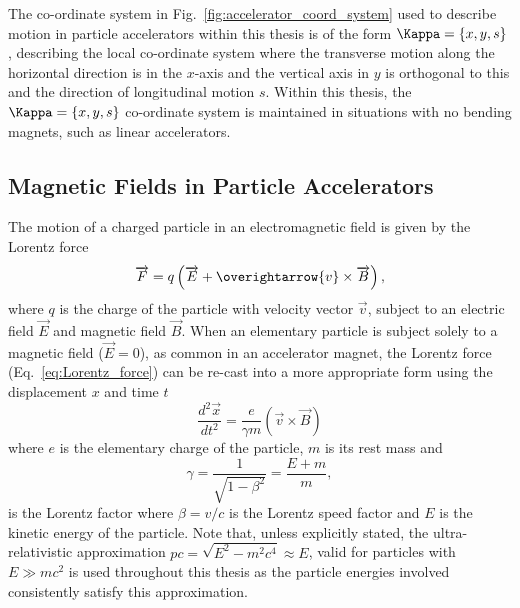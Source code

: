 \documentclass[../main.tex]{subfiles}
\begin{document}
The co-ordinate system in Fig.~\ref{fig:accelerator_coord_system} used to describe motion in particle accelerators within this thesis is of the form $\Kappa = \left\{x,y,s\right\}$, describing the local co-ordinate system where the transverse motion along the horizontal direction is in the $x$-axis and the vertical axis in $y$ is orthogonal to this and the direction of longitudinal motion $s$. Within this thesis, the $\Kappa = \left\{x,y,s\right\}$ co-ordinate system is maintained in situations with no bending magnets, such as linear accelerators.     

\subsection{Magnetic Fields in Particle Accelerators}

The motion of a charged particle in an electromagnetic field is given by the Lorentz force 
\begin{equation}
\overrightarrow{F} = q\left(\overrightarrow{E}+\overightarrow{v}\times\overrightarrow{B}\right),
\label{eq:Lorentz_force}    
\end{equation}
where $q$ is the charge of the particle with velocity vector $\overrightarrow{v}$, subject to an electric field $\overrightarrow{E}$ and magnetic field $\overrightarrow{B}$. When an elementary particle is subject solely to a magnetic field ($\overrightarrow{E}=0$), as common in an accelerator magnet, the Lorentz force (Eq.~\ref{eq:Lorentz_force}) can be re-cast into a more appropriate form using the displacement $x$ and time $t$
\begin{equation}
\frac{d^{2}\overrightarrow{x}}{dt^{2}} = \frac{e}{\gamma m}\left(\overrightarrow{v}\times\overrightarrow{B}\right)
\label{eq:displacement_Lorentz}    
\end{equation}
where $e$ is the elementary charge of the particle, $m$ is its rest mass and
\begin{equation}
\gamma = \frac{1}{\sqrt{1-\beta^{2}}} = \frac{E+m}{m},
\label{eq:Lorentz_factor}    
\end{equation}
is the Lorentz factor where $\beta = v/c$ is the Lorentz speed factor and $E$ is the kinetic energy of the particle. Note that, unless explicitly stated, the ultra-relativistic approximation $pc = \sqrt{E^{2}-m^{2}c^{4}} \approx E$, valid for particles with $E \gg mc^{2}$ is used throughout this thesis as the particle energies involved consistently satisfy this approximation.   
\end{document}
